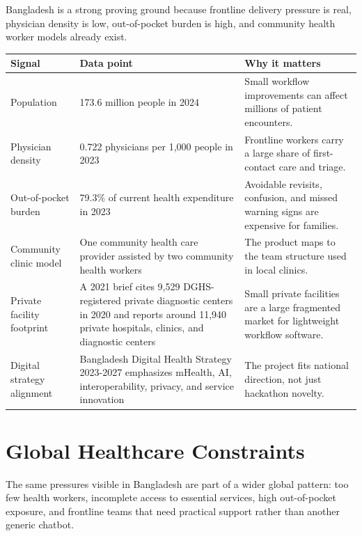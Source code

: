 \documentclass[11pt,letterpaper]{article}
\begin{document}
Bangladesh is a strong proving ground because frontline delivery pressure is real, physician density is low, out-of-pocket burden is high, and community health worker models already exist.

\begin{table}[H]
\centering
\begin{tabularx}{\linewidth}{@{}L{1.8in}L{1.55in}Y@{}}
\toprule
\textbf{Signal} & \textbf{Data point} & \textbf{Why it matters} \\
\midrule
Population & 173.6 million people in 2024 & Small workflow improvements can affect millions of patient encounters. \\
Physician density & 0.722 physicians per 1,000 people in 2023 & Frontline workers carry a large share of first-contact care and triage. \\
Out-of-pocket burden & 79.3\% of current health expenditure in 2023 & Avoidable revisits, confusion, and missed warning signs are expensive for families. \\
Community clinic model & One community health care provider assisted by two community health workers & The product maps to the team structure used in local clinics. \\
Private facility footprint & A 2021 brief cites 9,529 DGHS-registered private diagnostic centers in 2020 and reports around 11,940 private hospitals, clinics, and diagnostic centers & Small private facilities are a large fragmented market for lightweight workflow software. \\
Digital strategy alignment & Bangladesh Digital Health Strategy 2023-2027 emphasizes mHealth, AI, interoperability, privacy, and service innovation & The project fits national direction, not just hackathon novelty. \\
\bottomrule
\end{tabularx}
\end{table}

\section{Global Healthcare Constraints}

The same pressures visible in Bangladesh are part of a wider global pattern: too few health workers, incomplete access to essential services, high out-of-pocket exposure, and frontline teams that need practical support rather than another generic chatbot.
\end{document}
